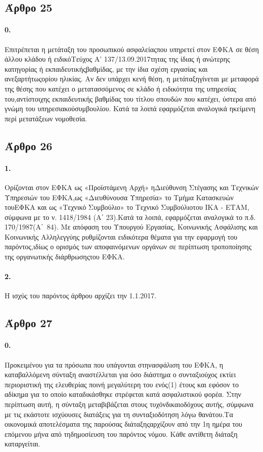 \documentclass[a4paper,oneside, 10pt]{book}
\begin{document}
\subsection*{ Άρθρο 25 }
\paragraph { 0. } Επιτρέπεται η μετάταξη του προσωπικού ασφαλείαςπου υπηρετεί στον ΕΦΚΑ σε θέση άλλου κλάδου ή ειδικόΤεύχος Α’ 137/13.09.2017τητας της ίδιας ή ανώτερης κατηγορίας ή εκπαιδευτικήςβαθμίδας, με την ίδια σχέση εργασίας και ανεξαρτήτωςορίου ηλικίας. Αν δεν υπάρχει κενή θέση, η μετάταξηγίνεται με μεταφορά της θέσης που κατέχει ο μετατασσόμενος σε κλάδο ή ειδικότητα της υπηρεσίας του,αντίστοιχης εκπαιδευτικής βαθμίδας του τίτλου σπουδών που κατέχει, ύστερα από γνώμη του υπηρεσιακούσυμβουλίου. Κατά τα λοιπά εφαρμόζεται αναλογικά ηκείμενη περί μετατάξεων νομοθεσία.
\subsection*{ Άρθρο 26 }
\paragraph { 1. } Ορίζονται στον ΕΦΚΑ ως «Προϊστάμενη Αρχή» ηΔιεύθυνση Στέγασης και Τεχνικών Υπηρεσιών του ΕΦΚΑ,ως «Διευθύνουσα Υπηρεσία» το Τμήμα Κατασκευών τουΕΦΚΑ και ως «Τεχνικό Συμβούλιο» το Τεχνικό Συμβούλιοτου ΙΚΑ - ΕΤΑΜ, σύμφωνα με το ν. 1418/1984 (Α΄ 23).Κατά τα λοιπά, εφαρμόζεται αναλογικά το π.δ. 170/1987(Α΄ 84). Με απόφαση του Υπουργού Εργασίας, Κοινωνικής Ασφάλισης και Κοινωνικής Αλληλεγγύης ρυθμίζονται ειδικότερα θέματα για την εφαρμογή του παρόντος,ιδίως ο ορισμός των αποφαινόμενων οργάνων σε περίπτωση τροποποίησης της οργανωτικής διάρθρωσηςτου ΕΦΚΑ.
\paragraph { 2. } Η ισχύς του παρόντος άρθρου αρχίζει την 1.1.2017.
\subsection*{ Άρθρο 27 }
\paragraph { 0. } Προκειμένου για τα πρόσωπα που υπάγονται στηνασφάλιση του ΕΦΚΑ, η καταβαλλόμενη σύνταξη αναστέλλεται για όσο διάστημα ο συνταξιούχος εκτίει περιοριστική της ελευθερίας ποινή μεγαλύτερη του ενός(1) έτους και εφόσον το αδίκημα για το οποίο καταδικάσθηκε στρέφεται κατά ασφαλιστικού φορέα. Στην περίπτωση αυτή, η σύνταξη μεταβιβάζεται στους τυχόνδικαιοδόχους αυτής, σύμφωνα με τις εκάστοτε ισχύουσες διατάξεις για τη συνταξιοδότηση λόγω θανάτου.Τα οικονομικά αποτελέσματα της παρούσας διάταξηςαρχίζουν από την 1η ημέρα του επόμενου μήνα από τηδημοσίευση του παρόντος νόμου. Κάθε αντίθετη διάταξη καταργείται.
\end{document}

